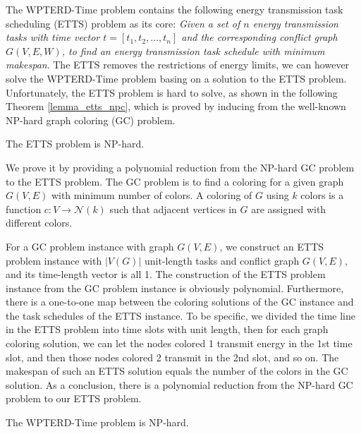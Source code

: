 \documentclass[12pt,journal,onecolumn,draftcls]{IEEEtran}
\begin{document}
The WPTERD-Time problem contains the following energy transmission task scheduling (ETTS) problem as its core: \textit{Given a set of $n$ energy transmission tasks with time vector $t{=}[t_1,t_2,\ldots,t_n]$ and the corresponding conflict graph $G(V,E,W)$, to find an energy transmission task schedule with minimum makespan}. The ETTS removes the restrictions of energy limits, we can however solve the WPTERD-Time problem basing on a solution to the ETTS problem. Unfortunately, the ETTS problem is hard to solve, as shown in the following Theorem \ref{lemma_etts_npc}, which is proved by inducing from the well-known NP-hard graph coloring (GC) problem.

\begin{theorem}
\label{lemma_etts_npc}
The ETTS problem is NP-hard.
\end{theorem}

\begin{IEEEproof}
We prove it by providing a polynomial reduction from the NP-hard GC problem to the ETTS problem. The GC problem is to find a coloring for a given graph $G(V,E)$ with minimum number of colors. A coloring of $G$ using $k$ colors is a function $c{:}V{\rightarrow}\mathcal{N}(k)$ such that adjacent vertices in $G$ are assigned with different colors.

For a GC problem instance with graph $G(V,E)$, we construct an ETTS problem instance with $|V(G)|$ unit-length tasks and conflict graph $G(V,E)$, and its time-length vector is all 1. The construction of the ETTS problem instance from the GC problem instance is obviously polynomial. Furthermore, there is a one-to-one map between the coloring solutions of the GC instance and the task schedules of the ETTS instance. To be specific, we divided the time line in the ETTS problem into time slots with unit length, then for each graph coloring solution, we can let the nodes colored 1 transmit energy in the 1st time slot, and then those nodes colored 2 transmit in the 2nd slot, and so on. The makespan of such an ETTS solution equals the number of the colors in the GC solution. As a conclusion, there is a polynomial reduction from the NP-hard GC problem to our ETTS problem.
\end{IEEEproof}

\begin{theorem}
\label{lemma_wpterd_time_npc}
The WPTERD-Time problem is NP-hard.
\end{theorem}
\end{document}
